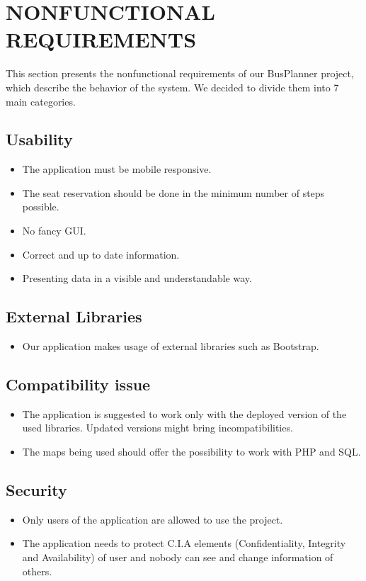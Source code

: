 \section{NONFUNCTIONAL REQUIREMENTS}
This section presents the nonfunctional requirements of our BusPlanner project, which describe the behavior of the system. We decided to divide them into 7 main categories.
\subsection{Usability}
\begin{itemize}
	\item The application must be mobile responsive.
	\item The seat reservation should be done in the minimum number of steps possible.
	\item No fancy GUI.
	\item Correct and up to date information.
	\item Presenting data in a visible and understandable way.	
\end{itemize}
\subsection{External Libraries}
\begin{itemize}
	\item Our application makes usage of external libraries such as Bootstrap.
\end{itemize}
\subsection{Compatibility issue}
\begin{itemize}
	\item The application is suggested to work only with the deployed version of the used libraries. Updated versions might bring incompatibilities. 
	\item The maps being used should offer the possibility to work with PHP and SQL.
\end{itemize}
\subsection{Security}
\begin{itemize}
	\item Only users of the application are allowed to use the project. 
	\item The application needs to protect C.I.A elements (Confidentiality, Integrity and Availability) of user and nobody can see and change information of others.
\end{itemize}
